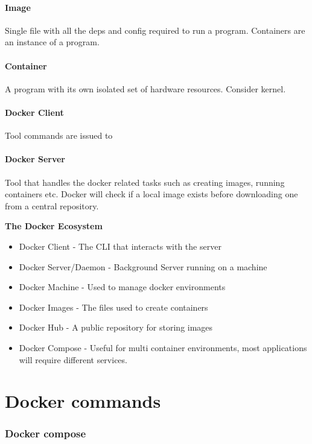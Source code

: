 \documentclass[a4paper, 11pt]{book}
\begin{document}
    \paragraph{Image}
    Single file with all the deps and config required to run a program.
    Containers are an instance of a program.

    \paragraph{Container}
    A program with its own isolated set of hardware resources. Consider kernel.

    \paragraph{Docker Client}
    Tool commands are issued to

    \paragraph{Docker Server}
    Tool that handles the docker related tasks such as creating images, running containers etc.
    Docker will check if a local image exists before downloading one from a central repository.


    \textbf{The Docker Ecosystem}

    \begin{itemize}[label=-]
        \item Docker Client - The CLI that interacts with the server
        \item Docker Server/Daemon - Background Server running on a machine
        \item Docker Machine - Used to manage docker environments
        \item Docker Images - The files used to create containers
        \item Docker Hub - A public repository for storing images
        \item Docker Compose - Useful for multi container environments, most applications will require different services.
    \end{itemize}


    \section{Docker commands}

    \subsubsection{Docker compose}
\end{document}
